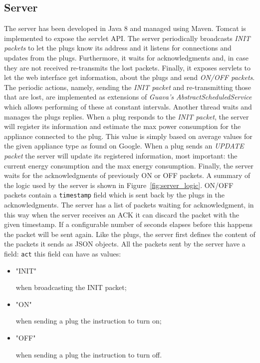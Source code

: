 \documentclass[conference]{IEEEtran}
\begin{document}
	\subsection{Server}\label{SVR}
	The server has been developed in Java 8 and managed using Maven. Tomcat is implemented to expose the servlet API. The server periodically broadcasts \textit{INIT packets} to let the plugs know its address and it listens for connections and updates from the plugs. Furthermore, it waits for acknowledgments and, in case they are not received re-transmits the lost packets. Finally, it exposes servlets to let the web interface get information, about the plugs and send \textit{ON/OFF packets}. The periodic actions, namely, sending the \textit{INIT packet} and re-transmitting those that are lost, are implemented as extensions of \textit{Guava's AbstractScheduledService} which allows performing of these at constant intervals. Another thread waits and manages the plugs replies. When a plug responds to the \textit{INIT packet}, the server will register its information and estimate the max power consumption for the appliance connected to the plug. This value is simply based on average values for the given appliance type as found on Google. When a plug sends an \textit{UPDATE packet} the server will update its registered information, most important: the current energy consumption and the max energy consumption. Finally, the server waits for the acknowledgments of previously ON or OFF packets. A summary of the logic used by the server is shown in Figure~\ref{fig:server_logic}. ON/OFF packets contain a \verb|timestamp| field which is sent back by the plugs in the acknowledgments. The server has a list of packets waiting for acknowledgment, in this way when the server receives an ACK it can discard the packet with the given timestamp. If a configurable number of seconds elapses before this happens the packet will be sent again. Like the plugs, the server first defines the content of the packets it sends as JSON objects. All the packets sent by the server have a field: \verb|act| this field can have as values:
	\begin{itemize}
		\item \begin{spverbatim}"INIT"\end{spverbatim} when broadcasting the INIT packet;
		\item \begin{spverbatim}"ON"\end{spverbatim} when sending a plug the instruction to turn on;
		\item \begin{spverbatim}"OFF"\end{spverbatim} when sending a plug the instruction to turn off.
	\end{itemize}
\end{document}
